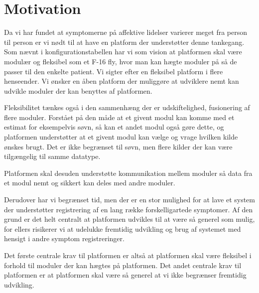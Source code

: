 \section{Motivation} %

Da vi har fundet at symptomerne på affektive lidelser varierer meget fra person til person er vi nødt til at have en platform der understøtter denne tankegang.
Som nævnt i konfigurationstabellen har vi som vision at platformen skal være modulær og fleksibel som et F-16 fly, hvor man kan hægte moduler på så de passer til den enkelte patient.
Vi sigter efter en fleksibel platform i flere henseender.
Vi ønsker en åben platform der muliggøre at udviklere nemt kan udvikle moduler der kan benyttes af platformen.

Fleksibilitet tænkes også i den sammenhæng der er udskiftelighed, fusionering af flere moduler. Forstået på den måde at et givent modul kan komme med et estimat for eksempelvis søvn, så kan et andet modul også gøre dette, og platformen understøtter at et givent modul kan vælge og vrage hvilken kilde ønskes brugt.
Det er ikke begrænset til søvn, men flere kilder der kan være tilgængelig til samme datatype.

Platformen skal desuden understøtte kommunikation mellem moduler så data fra et modul nemt og sikkert kan deles med andre moduler.

Derudover har vi begrænset tid, men der er en stor mulighed for at lave et system der understøtter registrering af en lang række forskelligartede symptomer.
Af den grund er det helt centralt at platformen udvikles til at være så generel som mulig, for ellers risikerer vi at udelukke fremtidig udvikling og brug af systemet med hensigt i andre symptom registreringer.

Det første centrale krav til platformen er altså at platformen skal være fleksibel i forhold til moduler der kan hægtes på platformen.
Det andet centrale krav til platformen er at platformen skal være så generel at vi ikke begrænser fremtidig udvikling.